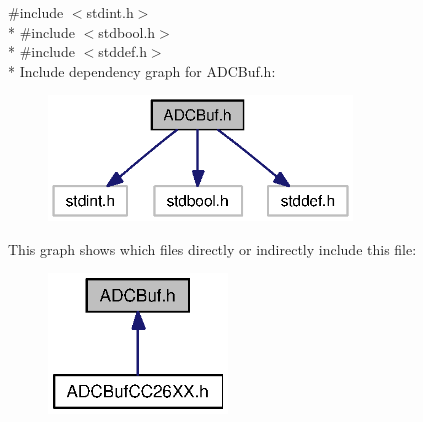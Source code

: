 {\ttfamily \#include $<$stdint.\+h$>$}\\*
{\ttfamily \#include $<$stdbool.\+h$>$}\\*
{\ttfamily \#include $<$stddef.\+h$>$}\\*
Include dependency graph for A\+D\+C\+Buf.\+h\+:
\nopagebreak
\begin{figure}[H]
\begin{center}
\leavevmode
\includegraphics[width=229pt]{_a_d_c_buf_8h__incl}
\end{center}
\end{figure}
This graph shows which files directly or indirectly include this file\+:
\nopagebreak
\begin{figure}[H]
\begin{center}
\leavevmode
\includegraphics[width=135pt]{_a_d_c_buf_8h__dep__incl}
\end{center}
\end{figure}
